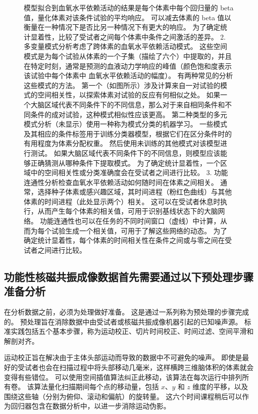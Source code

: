 \begin{figure}[htbp]
{		模型拟合到血氧水平依赖活动的结果是每个体素中每个回归量的 beta 值，量化体素对该条件试验的平均响应。 
		可以减去体素的 beta 值以衡量在一种情况下是否比另一种情况下有更大的响应。 
		为了确定统计显着性，比较了受试者之间每个体素中条件之间激活的差异。 
		2. 多变量模式分析考虑了跨体素的血氧水平依赖活动模式。 
		这些空间模式是为每个试验从体素的一个子集（描绘了六个）中提取的，并且在特定时刻，通常是预测的血液动力学响应的峰值（颜色饱和度表示该试验中每个体素中 血氧水平依赖活动的幅度）。 有两种常见的分析这些模式的方法。 
		第一个（如图所示）涉及计算来自一对试验的模式的空间相关性，以探索体素对试验的反应有何相似之处。 
		如果一个大脑区域代表不同条件下的不同信息，那么对于来自相同条件和不同条件的成对试验，这种模式相似性应该更高。 
		第二种类型的多元模式分析（未显示）使用一种称为模式分类的机器学习。 
		一些模式及其相应的条件标签用于训练分类器模型，根据它们在区分条件时的有用程度为体素分配权重。 
		然后使用未训练的其他模式对该模型进行测试。 
		如果大脑区域代表不同条件下的不同信息，则模型应该能够正确猜测从哪种条件下提取模式。 
		为了确定统计显着性，一个区域中的空间相关性或分类准确度会在受试者之间进行比较。 
		3. 功能连通性分析检查血氧水平依赖活动如何随时间在体素之间相关。 
		通常，选择种子体素或感兴趣区域，其时间进程（粉红色曲线）与其他体素的时间进程（此处显示两个）相关。 
		这可以在受试者休息时执行，从而产生每个体素的相关值，可用于识别基线状态下的大脑网络。 
		功能连通性也可以在任务的不同时间窗口（虚线）中计算，从而为每个试验生成一个相关值，可用于了解这些网络的动态。 
		为了确定统计显着性，每个体素的时间相关性在条件之间或与零之间在受试者之间进行比较。}
	\label{fig:6_2}
\end{figure}



\subsection{功能性核磁共振成像数据首先需要通过以下预处理步骤准备分析}

在分析数据之前，必须为处理做好准备。 
这是通过一系列称为预处理的步骤完成的。 
预处理旨在消除数据中由受试者或核磁共振成像机器引起的已知噪声源。 
标准实践包括五个基本步骤，称为运动校正、切片时间校正、时间过滤、空间平滑和解剖对齐。


运动校正旨在解决由于主体头部运动而导致的数据中不可避免的噪声。
即使是最好的受试者也会在扫描过程中将头部移动几毫米，这样横跨三维脑体积的体素就会变得有些错位。
可以使用空间插值算法纠正此移动，该算法在每次运行中排列所有卷。
该算法量化扫描期间每个点的移动量，包括 $x$、$y$ 和 $z$ 维度的平移，以及围绕这些轴（分别为俯仰、滚动和偏航）的旋转量。
这六个时间课程稍后可以作为回归器包含在数据分析中，以进一步消除运动伪影。



